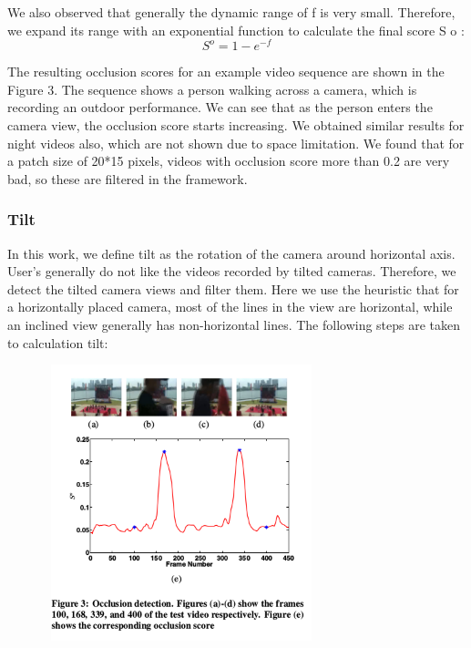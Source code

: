 \documentclass{sig-alternate}
\begin{document}
\par We also observed that generally the dynamic range of f is very
small. Therefore, we expand its range with an exponential function
to calculate the final score S o :
     \begin{equation}
              S^o = 1-e^{-f}
       \end{equation}

\par The resulting occlusion scores for an example video sequence
are shown in the Figure 3. The sequence shows a person walking
across a camera, which is recording an outdoor performance. We
can see that as the person enters the camera view, the occlusion
score starts increasing. We obtained similar results for night videos
also, which are not shown due to space limitation. We found that
for a patch size of 20*15 pixels, videos with occlusion score more
than 0.2 are very bad, so these are filtered in the framework.

\subsubsection{Tilt}
In this work, we define tilt as the rotation of the camera around
horizontal axis. User’s generally do not like the videos recorded
by tilted cameras. Therefore, we detect the tilted camera views
and filter them. Here we use the heuristic that for a horizontally
placed camera, most of the lines in the view are horizontal, while
an inclined view generally has non-horizontal lines. The following
steps are taken to calculation tilt:

\begin{figure}
\centering
\includegraphics[height = 8cm,width=8cm]{fig3.png}
\end{figure}
\end{document}
